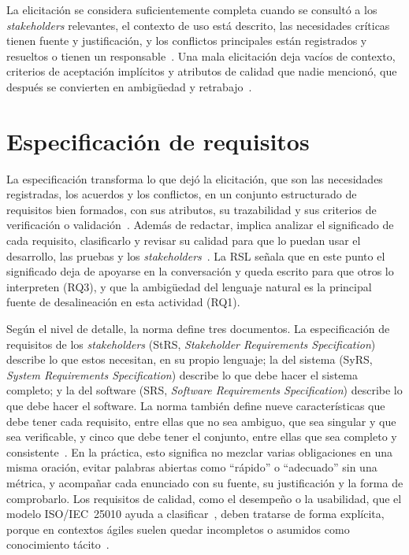 \documentclass[12pt,letterpaper,oneside]{report}
\begin{document}
La elicitación se considera suficientemente completa cuando se consultó a los
\textit{stakeholders} relevantes, el contexto de uso está descrito, las
necesidades críticas tienen fuente y justificación, y los conflictos principales
están registrados y resueltos o tienen un responsable~\cite{iso29148}. Una mala
elicitación deja vacíos de contexto, criterios de aceptación implícitos y
atributos de calidad que nadie mencionó, que después se convierten en
ambigüedad y retrabajo~\cite{asadabadi2020ambiguity}.

\section{Especificación de requisitos}
\label{sec:car_especificacion}
La especificación transforma lo que dejó la elicitación, que son las necesidades
registradas, los acuerdos y los conflictos, en un conjunto estructurado de
requisitos bien formados, con sus atributos, su trazabilidad y sus criterios de
verificación o validación~\cite{iso29148}. Además de redactar, implica analizar
el significado de cada requisito, clasificarlo y revisar su calidad para que lo
puedan usar el desarrollo, las pruebas y los
\textit{stakeholders}~\cite{ireb2026}. La RSL señala que en este punto el
significado deja de apoyarse en la conversación y queda escrito para que otros
lo interpreten (RQ3), y que la ambigüedad del lenguaje natural es la principal
fuente de desalineación en esta actividad (RQ1).

Según el nivel de detalle, la norma define tres documentos. La especificación de
requisitos de los \textit{stakeholders} (StRS, \textit{Stakeholder Requirements
Specification}) describe lo que estos necesitan, en su propio lenguaje; la del
sistema (SyRS, \textit{System Requirements Specification}) describe lo que debe
hacer el sistema completo; y la del software (SRS, \textit{Software Requirements
Specification}) describe lo que debe hacer el software. La norma también define
nueve características que debe tener cada requisito, entre ellas que no sea
ambiguo, que sea singular y que sea verificable, y cinco que debe tener el
conjunto, entre ellas que sea completo y consistente~\cite{iso29148}. En la
práctica, esto significa no mezclar varias obligaciones en una misma oración,
evitar palabras abiertas como ``rápido'' o ``adecuado'' sin una métrica, y
acompañar cada enunciado con su fuente, su justificación y la forma de
comprobarlo. Los requisitos de calidad, como el desempeño o la usabilidad, que el
modelo ISO/IEC~25010 ayuda a clasificar~\cite{iso25010}, deben tratarse de
forma explícita, porque en contextos ágiles suelen quedar incompletos o
asumidos como conocimiento tácito~\cite{behutiye2022quality}.
\end{document}
